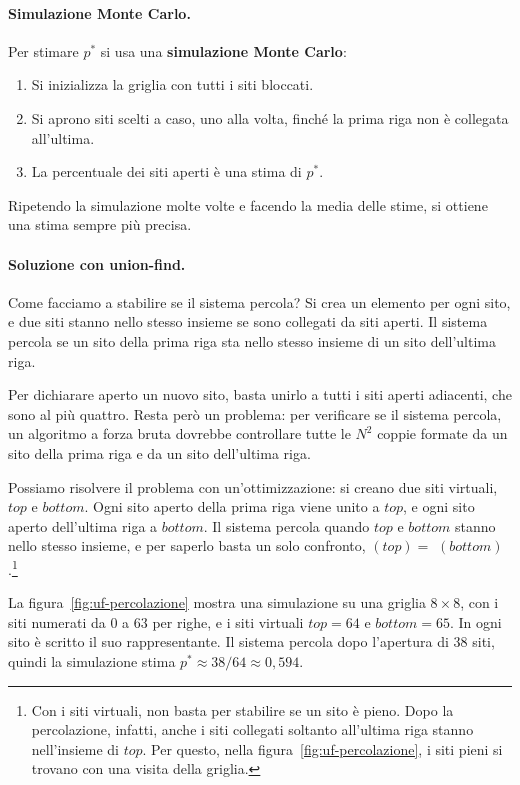 \paragraph{Simulazione Monte Carlo.}
Per stimare $p^*$ si usa una \textbf{simulazione Monte Carlo}:
\begin{enumerate}
    \item Si inizializza la griglia con tutti i siti bloccati.
    \item Si aprono siti scelti a caso, uno alla volta, finché la prima riga non è collegata all'ultima.
    \item La percentuale dei siti aperti è una stima di $p^*$.
\end{enumerate}

Ripetendo la simulazione molte volte e facendo la media delle stime, si ottiene una stima sempre più precisa.

\paragraph{Soluzione con union-find.}
Come facciamo a stabilire se il sistema percola? Si crea un elemento per ogni sito, e due siti stanno nello stesso insieme se sono collegati da siti aperti. Il sistema percola se un sito della prima riga sta nello stesso insieme di un sito dell'ultima riga.

Per dichiarare aperto un nuovo sito, basta unirlo a tutti i siti aperti adiacenti, che sono al più quattro. Resta però un problema: per verificare se il sistema percola, un algoritmo a forza bruta dovrebbe controllare tutte le $N^2$ coppie formate da un sito della prima riga e da un sito dell'ultima riga.

Possiamo risolvere il problema con un'ottimizzazione: si creano due siti virtuali, $\mathit{top}$ e $\mathit{bottom}$. Ogni sito aperto della prima riga viene unito a $\mathit{top}$, e ogni sito aperto dell'ultima riga a $\mathit{bottom}$. Il sistema percola quando $\mathit{top}$ e $\mathit{bottom}$ stanno nello stesso insieme, e per saperlo basta un solo confronto, \FindSet$(\mathit{top}) =$ \FindSet$(\mathit{bottom})$.\footnote{Con i siti virtuali, \FindSet{} non basta per stabilire se un sito è pieno. Dopo la percolazione, infatti, anche i siti collegati soltanto all'ultima riga stanno nell'insieme di $\mathit{top}$. Per questo, nella figura~\ref{fig:uf-percolazione}, i siti pieni si trovano con una visita della griglia.}

La figura~\ref{fig:uf-percolazione} mostra una simulazione su una griglia $8 \times 8$, con i siti numerati da $0$ a $63$ per righe, e i siti virtuali $\mathit{top} = 64$ e $\mathit{bottom} = 65$. In ogni sito è scritto il suo rappresentante. Il sistema percola dopo l'apertura di $38$ siti, quindi la simulazione stima $p^* \approx 38/64 \approx 0{,}594$.

